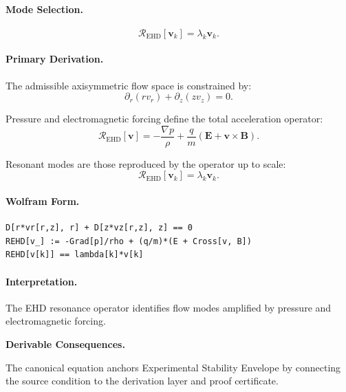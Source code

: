 \paragraph{Mode Selection.}
\begin{equation}
\mathcal{R}_{\mathrm{EHD}}[\mathbf{v}_k]
=
\lambda_k\mathbf{v}_k.
\end{equation}

\paragraph{Primary Derivation.}
The admissible axisymmetric flow space is constrained by:
\begin{equation}
\partial_r(rv_r)+\partial_z(zv_z)=0.
\end{equation}

Pressure and electromagnetic forcing define the total acceleration operator:
\begin{equation}
\mathcal{R}_{\mathrm{EHD}}[\mathbf{v}]
=
-\frac{\nabla p}{\rho}
+
\frac{q}{m}
(\mathbf{E}+\mathbf{v}\times\mathbf{B}).
\end{equation}

Resonant modes are those reproduced by the operator up to scale:
\begin{equation}
\boxed{
\mathcal{R}_{\mathrm{EHD}}[\mathbf{v}_k]
=
\lambda_k\mathbf{v}_k.
}
\end{equation}

\paragraph{Wolfram Form.}
\begin{verbatim}
D[r*vr[r,z], r] + D[z*vz[r,z], z] == 0
REHD[v_] := -Grad[p]/rho + (q/m)*(E + Cross[v, B])
REHD[v[k]] == lambda[k]*v[k]
\end{verbatim}

\paragraph{Interpretation.}
The EHD resonance operator identifies flow modes amplified by pressure and electromagnetic forcing.
\endgroup

\par\vspace{0.35em}
\noindent\textbf{Derivable Consequences.}\quad
\begingroup
\footnotesize
\raggedright
The canonical equation anchors Experimental Stability Envelope by connecting the source condition to the derivation layer and proof certificate.
\par\endgroup

